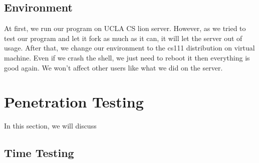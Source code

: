 \documentclass{article}
\begin{document}
\subsection{Environment}
At first, we run our program on UCLA CS lion server.  However, as we tried to test our program and let it fork as much as it can, it will let the server out of usage.  After that, we change our environment to the cs111 distribution on virtual machine.  Even if we crash the shell, we just need to reboot it then everything is good again.  We won’t affect other users like what we did on the server. \\ 


\section{Penetration Testing}

In this section, we will discuss 

\subsection{Time Testing}



\end{document}
